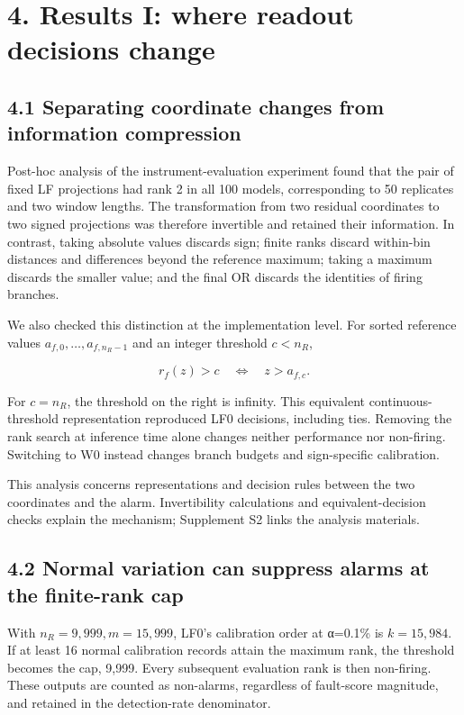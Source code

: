 \documentclass[10pt,a4paper]{article}
\begin{document}
\section{4. Results I: where readout decisions change}

\subsection{4.1 Separating coordinate changes from information compression}

Post-hoc analysis of the instrument-evaluation experiment found that the pair of fixed LF projections had rank 2 in all 100 models, corresponding to 50 replicates and two window lengths. The transformation from two residual coordinates to two signed projections was therefore invertible and retained their information. In contrast, taking absolute values discards sign; finite ranks discard within-bin distances and differences beyond the reference maximum; taking a maximum discards the smaller value; and the final OR discards the identities of firing branches.

We also checked this distinction at the implementation level. For sorted reference values \(a_{f,0},\ldots,a_{f,n_R-1}\) and an integer threshold \(c<n_R\),

\begin{equation}
r_f(z)>c\quad\Longleftrightarrow\quad z>a_{f,c}.
\tag{21}
\end{equation}

For \(c=n_R\), the threshold on the right is infinity. This equivalent continuous-threshold representation reproduced LF0 decisions, including ties. Removing the rank search at inference time alone changes neither performance nor non-firing. Switching to W0 instead changes branch budgets and sign-specific calibration.

This analysis concerns representations and decision rules between the two coordinates and the alarm. Invertibility calculations and equivalent-decision checks explain the mechanism; Supplement S2 links the analysis materials.

\subsection{4.2 Normal variation can suppress alarms at the finite-rank cap}

With \(n_R=9,999,m=15,999\), LF0's calibration order at α=0.1\% is \(k=15,984\). If at least 16 normal calibration records attain the maximum rank, the threshold becomes the cap, 9,999. Every subsequent evaluation rank is then non-firing. These outputs are counted as non-alarms, regardless of fault-score magnitude, and retained in the detection-rate denominator.
\end{document}
